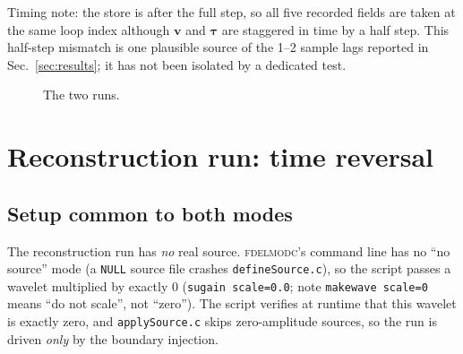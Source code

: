 \documentclass[11pt,a4paper]{article}
\newcommand{\vv}{\mathbf v}
\newcommand{\ff}{\mathbf f}
\newcommand{\fd}{\textsc{fdelmodc}}
\begin{document}
Timing note: the store is after the full step, so all five recorded fields are
taken at the same loop index although $\vv$ and $\bm\tau$ are staggered in time by
a half step. This half-step mismatch is one plausible source of the 1--2 sample
lags reported in Sec.~\ref{sec:results}; it has not been isolated by a dedicated test.

\begin{figure}[h]
\centering
{}
\caption{The two runs.}
\end{figure}

\section{Reconstruction run: time reversal}
\subsection{Setup common to both modes}
The reconstruction run has \emph{no} real source. \fd's command line has no ``no
source'' mode (a \texttt{NULL} source file crashes \texttt{defineSource.c}), so
the script passes a wavelet multiplied by exactly $0$ (\texttt{sugain scale=0.0};
note \texttt{makewave scale=0} means ``do not scale'', not ``zero''). The script
verifies at runtime that this wavelet is exactly zero, and \texttt{applySource.c}
skips zero-amplitude sources, so the run is driven \emph{only} by the boundary
injection.
\end{document}
